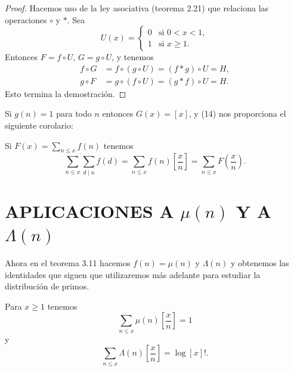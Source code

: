 \documentclass[12pt,a4paper]{book}
\begin{document}
    \begin{proof}
        Hacemos uso de la ley asociativa (teorema 2.21) que relaciona las operaciones
        $\circ$ y $*$. Sea
        \begin{equation*}
            U(x)=
            \begin{cases}
                0 & \text{si } 0<x<1,\\
                1 & \text{si } x\geq1.
            \end{cases}
        \end{equation*}
        Entonces $F=f\circ U$, $G=g\circ U$, y tenemos
        \begin{align*}
            f\circ G&=f\circ(g\circ U)=(f*g)\circ U=H,\\
            g\circ F&=g\circ(f\circ U)=(g*f)\circ U=H.
        \end{align*}
        Esto termina la demostración.
    \end{proof}

    Si $g(n)=1$ para todo $n$ entonces $G(x)=[x]$, y (14) nos proporciona el siguiente
    corolario:

    \begin{teorema}
        Si $F(x)=\sum_{n\leq x}f(n)$ tenemos
        \begin{equation}
            \sum_{n\leq x}\sum_{d\mid n}f(d)=\sum_{n\leq x}f(n)\left[\frac{x}{n}\right]
            =\sum_{n\leq x}F\left(\frac{x}{n}\right).
        \end{equation}
    \end{teorema}

    \section{APLICACIONES A \texorpdfstring{$\mu(n)$}{μ(n)} Y A \texorpdfstring{$\Lambda(n)$}{Λ(n)}}

    Ahora en el teorema 3.11 hacemos $f(n)=\mu(n)$ y $\Lambda(n)$ y obtenemos las
    identidades que siguen que utilizaremos más adelante para estudiar la distribución de
    primos.

    \begin{teorema}
        Para $x\geq1$ tenemos
        \begin{equation}
            \sum_{n\leq x}\mu(n)\left[\frac{x}{n}\right]=1
        \end{equation}
        y
        \begin{equation}
            \sum_{n\leq x}\Lambda(n)\left[\frac{x}{n}\right]=\log[x]!.
        \end{equation}
    \end{teorema}
\end{document}
